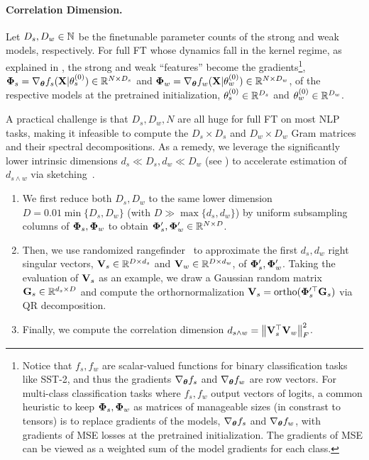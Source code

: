 \paragraph{Correlation Dimension.} 
Let $D_s, D_w \in \mathbb{N}$ be the finetunable parameter counts of the strong and weak models, respectively. For full FT whose dynamics fall in the kernel regime, as explained in , the strong and weak ``features'' become the gradients\footnote{
    Notice that $f_s, f_w$ are scalar-valued functions for binary classification tasks like SST-2, and thus the gradients $\nabla_{\boldsymbol{\theta}} f_s$ and $\nabla_{\boldsymbol{\theta}} f_w$ are row vectors.
    For multi-class classification tasks where $f_s, f_w$ output vectors of logits, a common heuristic to keep $\boldsymbol{\Phi}_s, \boldsymbol{\Phi}_w$ as matrices of manageable sizes (in constrast to tensors) is to replace gradients of the models, $\nabla_{\boldsymbol{\theta}} f_s$ and $\nabla_{\boldsymbol{\theta}} f_w$, with gradients of MSE losses at the pretrained initialization. 
    The gradients of MSE can be viewed as a weighted sum of the model gradients for each class.
}, $\boldsymbol{\Phi}_s = \nabla_{\boldsymbol{\theta}} f_s(\mathbf{X} | \theta_s^{(0)}) \in \mathbb{R}^{N \times D_s}$ and $\boldsymbol{\Phi}_w = \nabla_{\boldsymbol{\theta}} f_w(\mathbf{X} | \theta_w^{(0)}) \in \mathbb{R}^{N \times D_w}$, of the respective models at the pretrained initialization, $\theta_s^{(0)} \in \mathbb{R}^{D_s}$ and $\theta_w^{(0)} \in \mathbb{R}^{D_w}$.

A practical challenge is that $D_s, D_w, N$ are all huge for full FT on most NLP tasks, making it infeasible to compute the $D_s \times D_s$ and $D_w \times D_w$ Gram matrices and their spectral decompositions. 
As a remedy, we leverage the significantly lower intrinsic dimensions $d_s \ll D_s, d_w \ll D_w$ (see ) to accelerate estimation of $d_{s \wedge w}$ via sketching~\citep{halko2011finding,woodruff2014sketching}.
\begin{enumerate}[label=(\roman*)]
    \item We first reduce both $D_s, D_w$ to the same lower dimension $D = 0.01 \min\{D_s, D_w\}$ (with $D \gg \max\{d_s, d_w\}$) by uniform subsampling columns of $\boldsymbol{\Phi}_s, \boldsymbol{\Phi}_w$ to obtain $\boldsymbol{\Phi}_s', \boldsymbol{\Phi}_w' \in \mathbb{R}^{N \times D}$.
    \item Then, we use randomized rangefinder~\citep[Algorithm 4.1]{halko2011finding} to approximate the first $d_s, d_w$ right singular vectors, $\mathbf{V}_s \in \mathbb{R}^{D \times d_s}$ and $\mathbf{V}_w \in \mathbb{R}^{D \times d_w}$, of $\boldsymbol{\Phi}_s', \boldsymbol{\Phi}_w'$. Taking the evaluation of $\mathbf{V}_s$ as an example, we draw a Gaussian random matrix $\mathbf{G}_s \in \mathbb{R}^{d_s \times D}$ and compute the orthornormalization $\mathbf{V}_s = \mathrm{ortho}(\boldsymbol{\Phi}_s'^\top \mathbf{G}_s)$ via QR decomposition.
    \item Finally, we compute the correlation dimension $d_{s \wedge w} = \left\|\mathbf{V}_s^\top \mathbf{V}_w\right\|_F^2$.
\end{enumerate}

